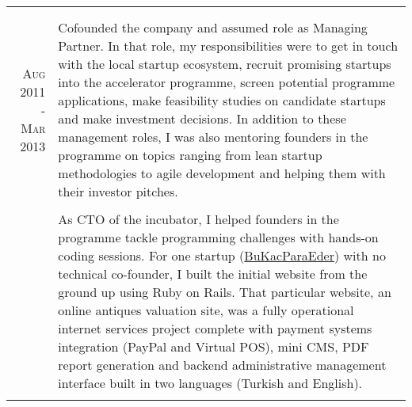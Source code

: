 \documentclass[a4paper,10pt]{article}
\newcommand{\exptitle}[2]{
  \multicolumn{2}{l}{\textsc{#1} \footnotesize{#2}} \\
  \specialrule{.01em}{0.5em}{1em}
}
\begin{document}
\begin{longtable}{r|p{11cm}}
  \multicolumn{2}{c}{} \\

  \newpage

  \exptitle{Enkuba}{Aug 2011 - Sep 2014}

  \textsc{Aug 2011 - Mar 2013}  & Cofounded the company and assumed role as Managing Partner. In that role, my responsibilities were to get in touch with the local startup ecosystem, recruit promising startups into the accelerator programme, screen potential programme applications, make feasibility studies on candidate startups and make investment decisions. In addition to these management roles, I was also mentoring founders in the programme on topics ranging from lean startup methodologies to agile development and helping them with their investor pitches. \\
                                & \\
                                & As CTO of the incubator, I helped founders in the programme tackle programming challenges with hands-on coding sessions. For one startup (\href{http://www.bukacparaeder.com}{BuKacParaEder}) with no technical co-founder, I built the initial website from the ground up using Ruby on Rails. That particular website, an online antiques valuation site, was a fully operational internet services project complete with payment systems integration (PayPal and Virtual POS), mini CMS, PDF report generation and backend administrative management interface built in two languages (Turkish and English). \\
  \multicolumn{2}{c}{} \\


\end{longtable}
\end{document}
